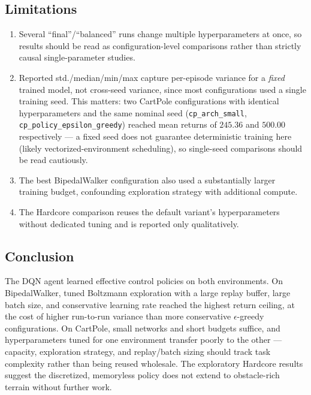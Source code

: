 \subsection{Limitations}
\label{sec:limitations}
\begin{enumerate}
    \item Several ``final''/``balanced'' runs change multiple hyperparameters at once, so results should be read as configuration-level comparisons rather than strictly causal single-parameter studies.
    \item Reported std./median/min/max capture per-episode variance for a \emph{fixed} trained model, not cross-seed variance, since most configurations used a single training seed. This matters: two CartPole configurations with identical hyperparameters and the same nominal seed (\texttt{cp\_arch\_small}, \texttt{cp\_policy\_epsilon\_greedy}) reached mean returns of $245.36$ and $500.00$ respectively — a fixed seed does not guarantee deterministic training here (likely vectorized-environment scheduling), so single-seed comparisons should be read cautiously.
    \item The best BipedalWalker configuration also used a substantially larger training budget, confounding exploration strategy with additional compute.
    \item The Hardcore comparison reuses the default variant's hyperparameters without dedicated tuning and is reported only qualitatively.
\end{enumerate}

\subsection{Conclusion}
The DQN agent learned effective control policies on both environments. On BipedalWalker, tuned Boltzmann exploration with a large replay buffer, large batch size, and conservative learning rate reached the highest return ceiling, at the cost of higher run-to-run variance than more conservative $\epsilon$-greedy configurations. On CartPole, small networks and short budgets suffice, and hyperparameters tuned for one environment transfer poorly to the other — capacity, exploration strategy, and replay/batch sizing should track task complexity rather than being reused wholesale. The exploratory Hardcore results suggest the discretized, memoryless policy does not extend to obstacle-rich terrain without further work.
